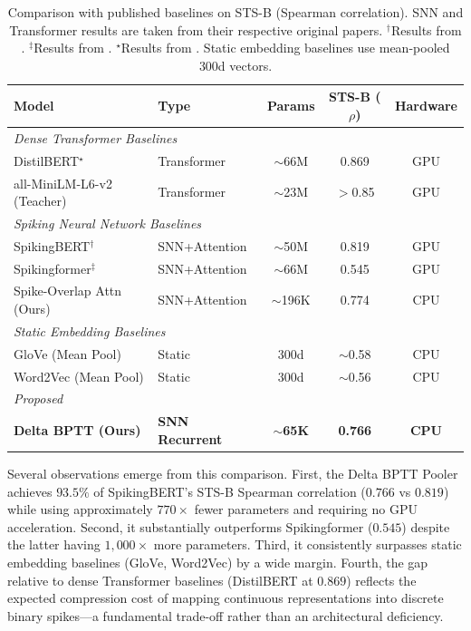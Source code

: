 \documentclass[10pt]{article} %
\begin{document}
\begin{table}[t!]
\caption{Comparison with published baselines on STS-B (Spearman correlation). SNN and Transformer results are taken from their respective original papers. $^\dagger$Results from \citet{bal2024spikingbert}. $^\ddagger$Results from \citet{zhou2025spikingformer}. $^\star$Results from \citet{sanh2019distilbert}. Static embedding baselines use mean-pooled 300d vectors.}
\label{tab:external_baselines}
\begin{center}
\begin{tabular}{llccc}
\toprule
\textbf{Model} & \textbf{Type} & \textbf{Params} & \textbf{STS-B ($\rho$)} & \textbf{Hardware} \\
\midrule
\multicolumn{5}{l}{\textit{Dense Transformer Baselines}} \\
DistilBERT$^\star$ & Transformer & $\sim$66M & 0.869 & GPU \\
all-MiniLM-L6-v2 (Teacher) & Transformer & $\sim$23M & $>$0.85 & GPU \\
\midrule
\multicolumn{5}{l}{\textit{Spiking Neural Network Baselines}} \\
SpikingBERT$^\dagger$ & SNN+Attention & $\sim$50M & 0.819 & GPU \\
Spikingformer$^\ddagger$ & SNN+Attention & $\sim$66M & 0.545 & GPU \\
Spike-Overlap Attn (Ours) & SNN+Attention & $\sim$196K & 0.774 & CPU \\
\midrule
\multicolumn{5}{l}{\textit{Static Embedding Baselines}} \\
GloVe (Mean Pool) & Static & 300d & $\sim$0.58 & CPU \\
Word2Vec (Mean Pool) & Static & 300d & $\sim$0.56 & CPU \\
\midrule
\multicolumn{5}{l}{\textit{Proposed}} \\
\textbf{Delta BPTT (Ours)} & \textbf{SNN Recurrent} & \textbf{$\sim$65K} & \textbf{0.766} & \textbf{CPU} \\
\bottomrule
\end{tabular}
\end{center}
\end{table}

Several observations emerge from this comparison. First, the Delta BPTT Pooler achieves $93.5\%$ of SpikingBERT's STS-B Spearman correlation ($0.766$ vs $0.819$) while using approximately $770\times$ fewer parameters and requiring no GPU acceleration. Second, it substantially outperforms Spikingformer ($0.545$) despite the latter having $1{,}000\times$ more parameters. Third, it consistently surpasses static embedding baselines (GloVe, Word2Vec) by a wide margin. Fourth, the gap relative to dense Transformer baselines (DistilBERT at $0.869$) reflects the expected compression cost of mapping continuous representations into discrete binary spikes---a fundamental trade-off rather than an architectural deficiency.
\end{document}
